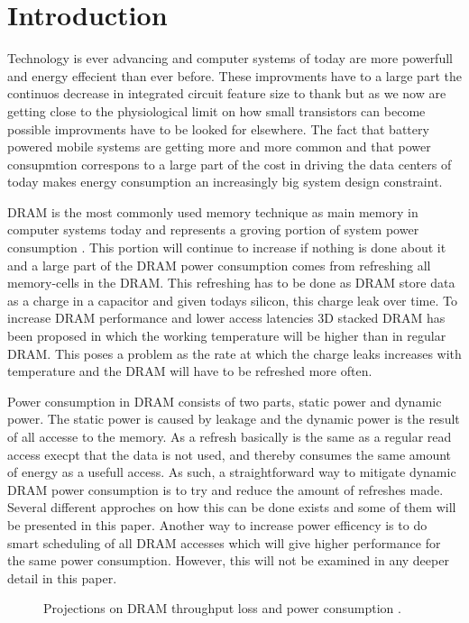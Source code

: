 \section{Introduction}
\label{sec:int}
Technology is ever advancing and computer systems of today are more powerfull and energy effecient than ever before. These improvments have to a large part the continuos decrease in integrated circuit feature size to thank but as we now are getting close to the physiological limit on how small transistors can become possible improvments have to be looked for elsewhere. The fact that battery powered mobile systems are getting more and more common and that power consupmtion correspons to a large part of the cost in driving the data centers of today makes energy consumption an increasingly big system design constraint.

DRAM is the most commonly used memory technique as main memory in computer systems today and represents a groving portion of system power consumption \cite{exascale}. This portion will continue to increase if nothing is done about it and a large part of the DRAM power consumption comes from refreshing all memory-cells in the DRAM. This refreshing has to be done as DRAM store data as a charge in a capacitor and given todays silicon, this charge leak over time. To increase DRAM performance and lower access latencies 3D stacked DRAM has been proposed in which the working temperature will be higher than in regular DRAM. This poses a problem as the rate at which the charge leaks increases with temperature and the DRAM will have to be refreshed more often.   

Power consumption in DRAM consists of two parts, static power and dynamic power. The static power is caused by leakage and the dynamic power is the result of all accesse to the memory. As a refresh basically is the same as a regular read access execpt that the data is not used, and thereby consumes the same amount of energy as a usefull access. As such, a straightforward way to mitigate dynamic DRAM power consumption is to try and reduce the amount of refreshes made. Several different approches on how this can be done exists and some of them will be presented in this paper. Another way to increase power efficency is to do smart scheduling of all DRAM accesses which will give higher performance for the same power consumption. However, this will not be examined in any deeper detail in this paper.  

\begin{figure*}[t]
    \centering
	\caption{Projections on DRAM throughput loss and power consumption \cite{raidr}.}
	\label{fig:dram_data_proj}
\end{figure*}